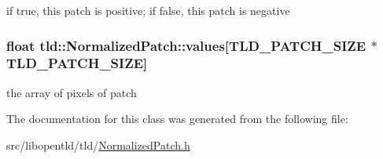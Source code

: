 if true, this patch is positive; if false, this patch is negative 

\hypertarget{classtld_1_1NormalizedPatch_ae76afafa7dd50901d7c468b92d1c1df5}{
\subsubsection[{values}]{\setlength{\rightskip}{0pt plus 5cm}float tld\-::\-Normalized\-Patch\-::values\mbox{[}{\bf T\-L\-D\-\_\-\-P\-A\-T\-C\-H\-\_\-\-S\-I\-Z\-E} $\ast${\bf T\-L\-D\-\_\-\-P\-A\-T\-C\-H\-\_\-\-S\-I\-Z\-E}\mbox{]}}}\label{classtld_1_1NormalizedPatch_ae76afafa7dd50901d7c468b92d1c1df5}


the array of pixels of patch 



The documentation for this class was generated from the following file\-:\begin{DoxyCompactItemize}
\item 
src/libopentld/tld/\hyperlink{NormalizedPatch_8h}{Normalized\-Patch.\-h}\end{DoxyCompactItemize}
